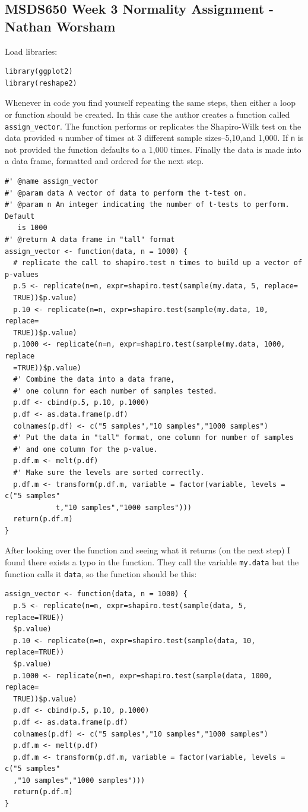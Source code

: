 \documentclass[10pt]{article}
\begin{document}
\subsection*{MSDS650 Week 3 Normality Assignment - Nathan Worsham}
Load libraries:
\begin{verbatim}
library(ggplot2)
library(reshape2)
\end{verbatim}
Whenever in code you find yourself repeating the same steps, then either a loop or function should be created. In this case the author creates a function called \verb|assign_vector|. The function performs or replicates the Shapiro-Wilk test on the data provided \textit{n} number of times at 3 different sample sizes--5,10,and 1,000. If \verb|n| is not provided the function defaults to a 1,000 times. Finally the data is made into a data frame, formatted and ordered for the next step. 
\begin{verbatim}
#' @name assign_vector
#' @param data A vector of data to perform the t-test on.
#' @param n An integer indicating the number of t-tests to perform. Default 
   is 1000
#' @return A data frame in "tall" format
assign_vector <- function(data, n = 1000) {
  # replicate the call to shapiro.test n times to build up a vector of p-values
  p.5 <- replicate(n=n, expr=shapiro.test(sample(my.data, 5, replace=
  TRUE))$p.value)
  p.10 <- replicate(n=n, expr=shapiro.test(sample(my.data, 10, replace=
  TRUE))$p.value)
  p.1000 <- replicate(n=n, expr=shapiro.test(sample(my.data, 1000, replace
  =TRUE))$p.value)
  #' Combine the data into a data frame, 
  #' one column for each number of samples tested.
  p.df <- cbind(p.5, p.10, p.1000)
  p.df <- as.data.frame(p.df)
  colnames(p.df) <- c("5 samples","10 samples","1000 samples")
  #' Put the data in "tall" format, one column for number of samples
  #' and one column for the p-value.
  p.df.m <- melt(p.df)
  #' Make sure the levels are sorted correctly.
  p.df.m <- transform(p.df.m, variable = factor(variable, levels = c("5 samples"
            t,"10 samples","1000 samples")))
  return(p.df.m)  
}
\end{verbatim}
After looking over the function and seeing what it returns (on the next step) I found there exists a typo in the function. They call the variable \verb|my.data| but the function calls it \verb|data|, so the function should be this:
\begin{verbatim}
assign_vector <- function(data, n = 1000) {
  p.5 <- replicate(n=n, expr=shapiro.test(sample(data, 5, replace=TRUE))
  $p.value)
  p.10 <- replicate(n=n, expr=shapiro.test(sample(data, 10, replace=TRUE))
  $p.value)
  p.1000 <- replicate(n=n, expr=shapiro.test(sample(data, 1000, replace=
  TRUE))$p.value)
  p.df <- cbind(p.5, p.10, p.1000)
  p.df <- as.data.frame(p.df)
  colnames(p.df) <- c("5 samples","10 samples","1000 samples")
  p.df.m <- melt(p.df)
  p.df.m <- transform(p.df.m, variable = factor(variable, levels = c("5 samples"
  ,"10 samples","1000 samples")))
  return(p.df.m)  
}
\end{verbatim}
\end{document}
